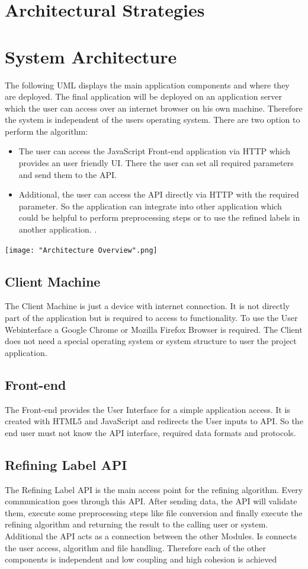 \documentclass[notitlepage]{article}
\begin{document}
\begin{flushleft}
\section{Architectural Strategies}

\section{System Architecture}
The following UML displays the main application components and where they are deployed. The final application will be deployed on an application server which the user can access over an internet browser on his own machine. Therefore the system is independent of the users operating system. There are two option to perform the 
algorithm:

\begin{itemize}
	\item The user can access the JavaScript Front-end application via HTTP which provides an user friendly UI. There the user can set all required parameters and send them to the API.
	\item Additional, the user can access the API directly via HTTP with the required parameter. So the application can integrate into other application which could be helpful to perform preprocessing steps or to use the refined labels in another application. .
\end{itemize}




\texttt{[image: "Architecture Overview".png]}

\subsection{Client Machine}
The Client Machine is just a device with internet connection. It is not directly part of the application but is required to access to functionality.
To use the User Webinterface a Google Chrome or Mozilla Firefox Browser is required. The Client does not need a special operating system or system structure to user 
the project application.
\subsection{Front-end}
The Front-end provides the User Interface for a simple application access. It is created with HTML5 and JavaScript and redirects the User inputs to API.
So the end user must not know the API interface, required data formats and protocols.
\subsection{Refining Label API}
The Refining Label API is the main access point for the refining algorithm. Every communication goes through this API. After sending data, 
the API will validate them, execute some preprocessing steps like file conversion and finally execute the refining algorithm and returning the result to the calling user or system. 
Additional the API acts as a connection between the other Modules. Is connects the user access, algorithm and file handling.
Therefore each of the other components is independent and low coupling and high cohesion is achieved   

\end{flushleft}
\end{document}
